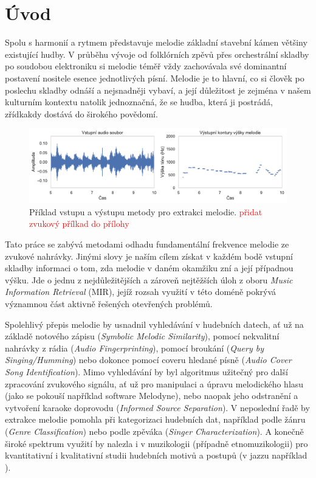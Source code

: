 \chapter{Úvod}\label{chap:uvod}

Spolu s harmonií a rytmem představuje melodie základní stavební kámen většiny existující hudby. V průběhu vývoje od folklórních zpěvů přes orchestrální skladby po soudobou elektroniku si melodie téměř vždy zachovávala své dominantní postavení nositele esence jednotlivých písní. Melodie je to hlavní, co si člověk po poslechu skladby odnáší a nejsnadněji vybaví, a její důležitost je zejména v našem kulturním kontextu natolik jednoznačná, že se hudba, která ji postrádá, zřídkakdy dostává do širokého povědomí.

\begin{figure}[h]\centering
\includegraphics[width=\textwidth,height=\textheight,keepaspectratio]{../img/input_output}
\caption{Příklad vstupu a výstupu metody pro extrakci melodie. \textcolor{red}{přidat zvukový přílkad do přílohy}}
\label{obr:input_output}
\end{figure}

Tato práce se zabývá metodami odhadu fundamentální frekvence melodie ze zvukové nahrávky. Jinými slovy je naším cílem získat v každém bodě vstupní skladby informaci o tom, zda melodie v daném okamžiku zní a její případnou výšku. Jde o jednu z nejdůležitějších a zároveň nejtěžších úloh z oboru \textit{Music Information Retrieval} (MIR), jejíž rozsah využití v této doméně pokrývá významnou část aktivně řešených otevřených problémů. 

Spolehlivý přepis melodie by usnadnil vyhledávání v hudebních datech, ať už na základě notového zápisu (\textit{Symbolic Melodic Similarity}), pomocí nekvalitní nahrávky z rádia (\textit{Audio Fingerprinting}), pomocí broukání (\textit{Query by Singing/Humming}) nebo dokonce pomocí coveru hledané písně (\textit{Audio Cover Song Identification}). Mimo vyhledávání by byl algoritmus užitečný pro další zpracování zvukového signálu, ať už pro manipulaci a úpravu melodického hlasu (jako se pokouší například software Melodyne), nebo naopak jeho odstranění a vytvoření karaoke doprovodu (\textit{Informed Source Separation}). V neposlední řadě by extrakce melodie pomohla při kategorizaci hudebních dat, například podle žánru (\textit{Genre Classification}) nebo podle zpěváka (\textit{Singer Characterization}). A konečně široké spektrum využití by nalezla i v muzikologii (případně etnomuzikologii) pro kvantitativní i kvalitativní studii hudebních motivů a postupů (v jazzu například \cite{Pfleiderer}).


